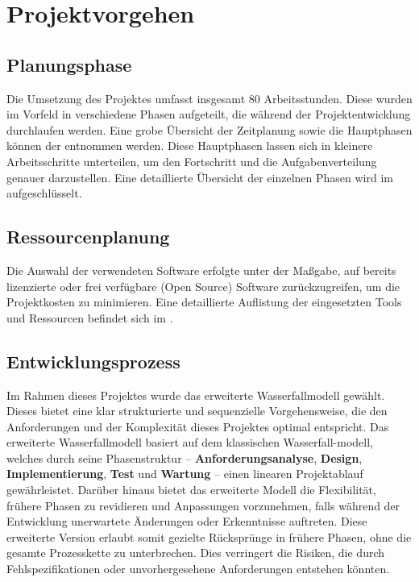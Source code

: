 \section{Projektvorgehen}
\label{sec:Projektvorgehen}

\subsection{Planungsphase}
\label{sec:Planungsphase}
Die Umsetzung des Projektes umfasst insgesamt 80 Arbeitsstunden. Diese wurden im Vorfeld in verschiedene Phasen aufgeteilt, die während der Projektentwicklung durchlaufen werden. Eine grobe Übersicht der Zeitplanung sowie die Hauptphasen können der  entnommen werden. %
Diese Hauptphasen lassen sich in kleinere Arbeitsschritte unterteilen, um den Fortschritt und die Aufgabenverteilung genauer darzustellen. Eine detaillierte Übersicht der einzelnen Phasen wird im  aufgeschlüsselt.


\subsection{Ressourcenplanung}
\label{sec:Ressourcenplanung}
Die Auswahl der verwendeten Software erfolgte unter der Maßgabe, auf bereits lizenzierte oder frei verfügbare (Open Source) Software zurückzugreifen, um die Projektkosten zu minimieren. Eine detaillierte Auflistung der eingesetzten Tools und Ressourcen befindet sich im .

\subsection{Entwicklungsprozess}
\label{sec:Entwicklungsprozess}
Im Rahmen dieses Projektes wurde das erweiterte Wasserfallmodell gewählt. Dieses bietet eine klar strukturierte und sequenzielle Vorgehensweise, die den Anforderungen und der Komplexität dieses Projektes optimal entspricht. 
Das erweiterte Wasserfallmodell basiert auf dem klassischen Wasserfall-modell, welches durch seine Phasenstruktur – \textbf{Anforderungsanalyse}, \textbf{Design}, \textbf{Implementierung}, \textbf{Test} und \textbf{Wartung} – einen linearen Projektablauf gewährleistet. Darüber hinaus bietet das erweiterte Modell die Flexibilität, frühere Phasen zu revidieren und Anpassungen vorzunehmen, falls während der Entwicklung unerwartete Änderungen oder Erkenntnisse auftreten. Diese erweiterte Version erlaubt somit gezielte Rücksprünge in frühere Phasen, ohne die gesamte Prozesskette zu unterbrechen. Dies verringert die Risiken, die durch Fehlspezifikationen oder unvorhergesehene Anforderungen entstehen könnten.
